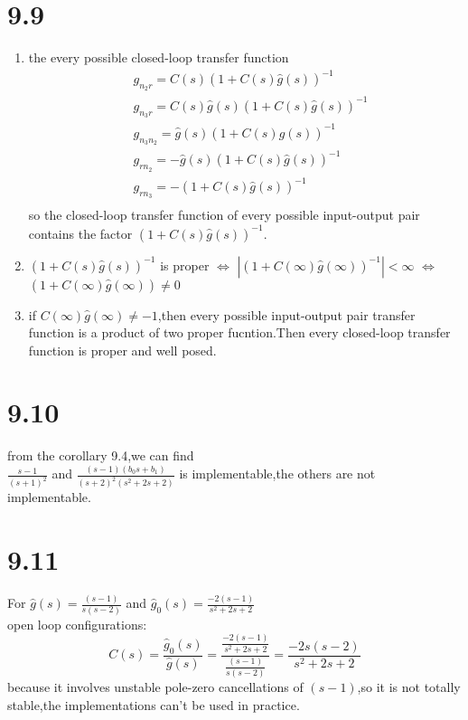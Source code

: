 \documentclass{article}
\begin{document}
\section*{9.9}
\begin{enumerate}
    \item  the every possible closed-loop transfer function
        \[
            \begin{split}
            &g_{n_2r}=C(s)(1+C(s)\hat{g}(s))^{-1}\\
            &g_{n_3r}=C(s)\hat{g}(s)(1+C(s)\hat{g}(s))^{-1}\\
            & g_{n_3n_2}=\hat{g}(s)(1+C(s)\hat{g}(s))^{-1}\\
            & g_{rn_2}=-\hat{g}(s)(1+C(s)\hat{g}(s))^{-1}\\
            &g_{rn_3}=-(1+C(s)\hat{g}(s))^{-1}\\
           \end{split}
            \]
        so the closed-loop transfer function of every possible input-output pair contains the factor $(1+C(s)\hat{g}(s))^{-1}$.
    \item $(1+C(s)\hat{g}(s))^{-1}$ is proper $\Leftrightarrow$ $|(1+C(\infty)\hat{g}(\infty))^{-1}|<\infty$ $\Leftrightarrow$ $(1+C(\infty)\hat{g}(\infty)) \neq 0$
    \item if $C(\infty)\hat{g}(\infty) \neq -1$,then every possible input-output pair transfer function is a product of two proper fucntion.Then every closed-loop transfer function is proper and well posed.
\end{enumerate}

\section*{9.10}
from the corollary 9.4,we can find\\
$\frac{s-1}{(s+1)^2}$ and $\frac{(s-1)(b_0s+b_1)}{(s+2)^2(s^2+2s+2)}$ is implementable,the others are not implementable.

\section*{9.11}
For $\hat{g}(s)=\frac{(s-1)}{s(s-2)}$ and $\hat{g}_0(s)=\frac{-2(s-1)}{s^2+2s+2}$\\
open loop configurations:\\
\[C(s)=\frac{\hat{g}_0(s)}{\hat{g}(s)}=\frac{\frac{-2(s-1)}{s^2+2s+2}}{\frac{(s-1)}{s(s-2)}}=\frac{-2s(s-2)}{s^2+2s+2}\]
because it involves unstable pole-zero cancellations of $(s-1)$,so it is not totally stable,the implementations can't be used in practice.\\
\end{document}
